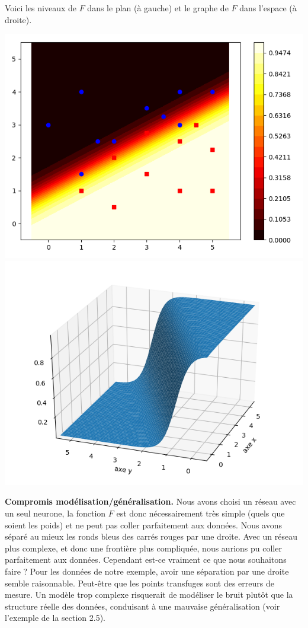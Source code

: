 \begin{exemple}{}{}
	Voici les niveaux de $F$ dans le plan (à gauche) et le graphe de $F$ dans l'espace (à droite).
	\begin{center}
		\includegraphics[scale=\myscale,scale=0.4]{figures/retro_01_g} \qquad
		\includegraphics[scale=\myscale,scale=0.5]{figures/retro_01_f}
	\end{center}
	
	
	\textbf{Compromis modélisation/généralisation.} Nous avons choisi un réseau avec un seul neurone, la fonction $F$ est donc nécessairement très simple (quels que soient les poids) et ne peut pas \og{}coller\fg{} parfaitement aux données. 
	Nous avons séparé au mieux les ronds bleus des carrés rouges par une droite. Avec un réseau plus complexe, et donc une frontière plus compliquée, nous aurions pu \og{}coller\fg{} parfaitement aux données. Cependant est-ce vraiment ce que nous souhaitons faire ? Pour les données de notre exemple, avoir une séparation par une droite semble raisonnable. Peut-être que les points transfuges sont des erreurs de mesure. Un modèle trop complexe risquerait de modéliser le bruit plutôt que la structure réelle des données, conduisant à une mauvaise généralisation (voir l'exemple de la section 2.5).
	
\end{exemple}

